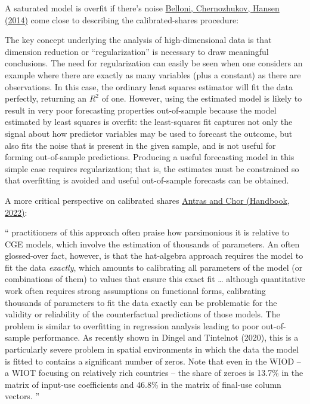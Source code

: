 \documentclass[11pt,notes=hide,aspectratio=169]{beamer}
\begin{document}
\begin{frame}{A saturated model is overfit if there's noise}
\href{https://www.aeaweb.org/articles?id=10.1257/jep.28.2.29}{Belloni, Chernozhukov, Hansen (2014)} come close to describing the calibrated-shares procedure:\\
{\small
The key concept underlying the analysis of high-dimensional data is that dimension reduction or ``regularization'' is necessary to draw meaningful conclusions. The need for regularization can easily be seen when one considers an example where there are exactly as many variables (plus a constant) as there are observations. In this case, the ordinary least squares estimator will fit the data perfectly, returning an $R^2$ of one. However, using the estimated model is likely to result in very poor forecasting properties out-of-sample because the model estimated by least squares is overfit: the least-squares fit captures not only the signal about how predictor variables may be used to forecast the outcome, but also fits the noise that is present in the given sample, and is not useful for forming out-of-sample predictions. Producing a useful forecasting model in this simple case requires regularization; that is, the estimates must be constrained so that overfitting is avoided and useful out-of-sample forecasts can be obtained.
\par}
\end{frame}
\begin{frame}{A more critical perspective on calibrated shares}
\href{https://doi.org/10.1016/bs.hesint.2022.02.005}{Antras and Chor (Handbook, 2022)}:\\
{\small
``
practitioners of this approach often praise how parsimonious it is relative to CGE models, which involve the estimation of thousands of parameters. An often glossed-over fact, however, is that the hat-algebra approach requires the model to fit the data \textit{exactly}, which amounts to calibrating all parameters of the model (or combinations of them) to values that ensure this exact fit
\dots
although quantitative work often requires strong assumptions on functional forms, calibrating thousands of parameters to fit the data exactly can be problematic for the validity or reliability of the counterfactual predictions of those models. The problem is similar to overfitting in regression analysis leading to poor out-of-sample performance. As recently shown in Dingel and Tintelnot (2020), this is a particularly severe problem in spatial environments in which the data the model is fitted to contains a significant number of zeros. Note that even in the WIOD -- a WIOT focusing on relatively rich countries -- the share of zeroes is 13.7\% in the matrix of input-use coefficients and 46.8\% in the matrix of final-use column vectors.%
''\par}
\end{frame}
\end{document}
